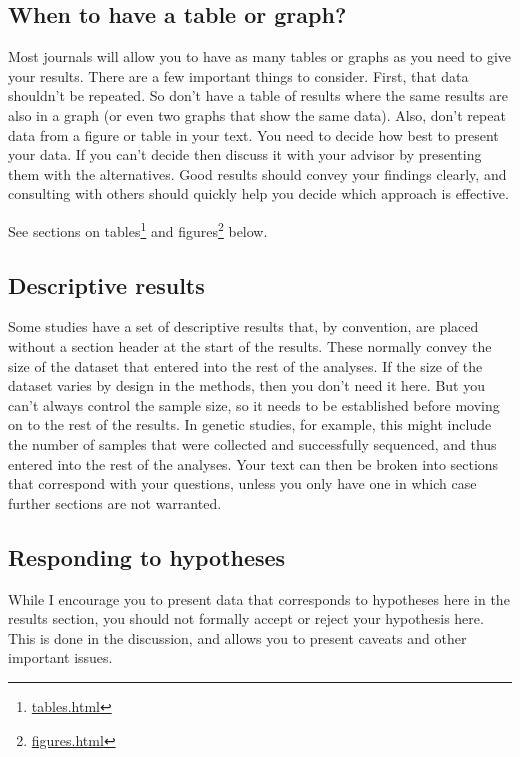 \documentclass[
]{krantz}
\renewcommand{\href}[2]{#2\footnote{\url{#1}}}
\begin{document}
\hypertarget{when-to-have-a-table-or-graph}{%
\subsection{When to have a table or graph?}\label{when-to-have-a-table-or-graph}}

Most journals will allow you to have as many tables or graphs as you need to give your results. There are a few important things to consider. First, that data shouldn't be repeated. So don't have a table of results where the same results are also in a graph (or even two graphs that show the same data). Also, don't repeat data from a figure or table in your text. You need to decide how best to present your data. If you can't decide then discuss it with your advisor by presenting them with the alternatives. Good results should convey your findings clearly, and consulting with others should quickly help you decide which approach is effective.

See sections on \href{tables.html}{tables} and \href{figures.html}{figures} below.

\hypertarget{descriptive-results}{%
\subsection{Descriptive results}\label{descriptive-results}}

Some studies have a set of descriptive results that, by convention, are placed without a section header at the start of the results. These normally convey the size of the dataset that entered into the rest of the analyses. If the size of the dataset varies by design in the methods, then you don't need it here. But you can't always control the sample size, so it needs to be established before moving on to the rest of the results. In genetic studies, for example, this might include the number of samples that were collected and successfully sequenced, and thus entered into the rest of the analyses. Your text can then be broken into sections that correspond with your questions, unless you only have one in which case further sections are not warranted.

\hypertarget{responding-to-hypotheses}{%
\subsection{Responding to hypotheses}\label{responding-to-hypotheses}}

While I encourage you to present data that corresponds to hypotheses here in the results section, you should not formally accept or reject your hypothesis here. This is done in the discussion, and allows you to present caveats and other important issues.
\end{document}
